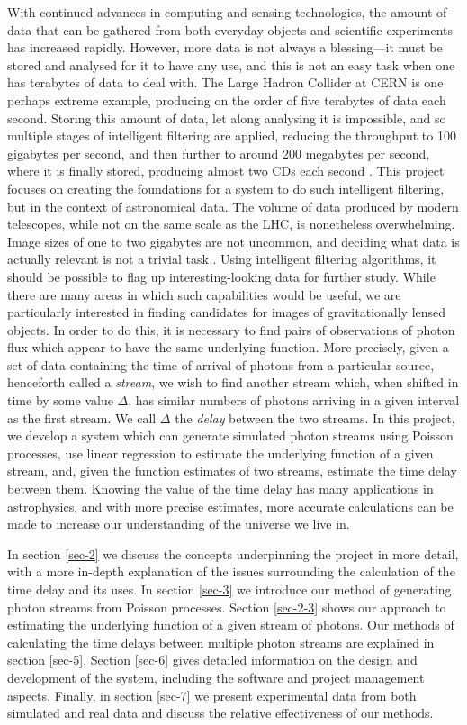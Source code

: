 \documentclass[a4paper,11pt]{article}
\begin{document}
With continued advances in computing and sensing technologies, the amount of
data that can be gathered from both everyday objects and scientific experiments
has increased rapidly. However, more data is not always a blessing---it must be
stored and analysed for it to have any use, and this is not an easy task when
one has terabytes of data to deal with. The Large Hadron Collider at CERN is one
perhaps extreme example, producing on the order of five terabytes of data each
second. Storing this amount of data, let along analysing it is impossible, and
so multiple stages of intelligent filtering are applied, reducing the throughput
to 100 gigabytes per second, and then further to around 200 megabytes per
second, where it is finally stored, producing almost two CDs each second
\cite{WLCGproc}. This project focuses on creating the foundations for a system
to do such intelligent filtering, but in the context of astronomical data. The
volume of data produced by modern telescopes, while not on the same scale as the
LHC, is nonetheless overwhelming. Image sizes of one to two gigabytes are not
uncommon, and deciding what data is actually relevant is not a trivial task
\cite{starck2002handbook}. Using intelligent filtering algorithms, it should be
possible to flag up interesting-looking data for further study. While there are
many areas in which such capabilities would be useful, we are particularly
interested in finding candidates for images of gravitationally lensed
objects. In order to do this, it is necessary to find pairs of observations of
photon flux which appear to have the same underlying function. More precisely,
given a set of data containing the time of arrival of photons from a particular
source, henceforth called a \emph{stream}, we wish to find another stream which,
when shifted in time by some value $\Delta$, has similar numbers of photons
arriving in a given interval as the first stream. We call $\Delta$ the
\emph{delay} between the two streams. In this project, we develop a system which
can generate simulated photon streams using Poisson processes, use linear
regression to estimate the underlying function of a given stream, and, given the
function estimates of two streams, estimate the time delay between them. Knowing
the value of the time delay has many applications in astrophysics, and with more
precise estimates, more accurate calculations can be made to increase our
understanding of the universe we live in.

In section \ref{sec-2} we discuss the concepts underpinning the project in more
detail, with a more in-depth explanation of the issues surrounding the
calculation of the time delay and its uses. In section \ref{sec-3} we introduce our method of generating photon streams from Poisson
processes. Section \ref{sec-2-3} shows our approach to estimating the
underlying function of a given stream of photons. Our methods of calculating the
time delays between multiple photon streams are explained in section \ref{sec-5}. Section \ref{sec-6} gives detailed information on the design and
development of the system, including the software and project management
aspects. Finally, in section \ref{sec-7} we present experimental data from both
simulated and real data and discuss the relative effectiveness of our methods.
\end{document}
